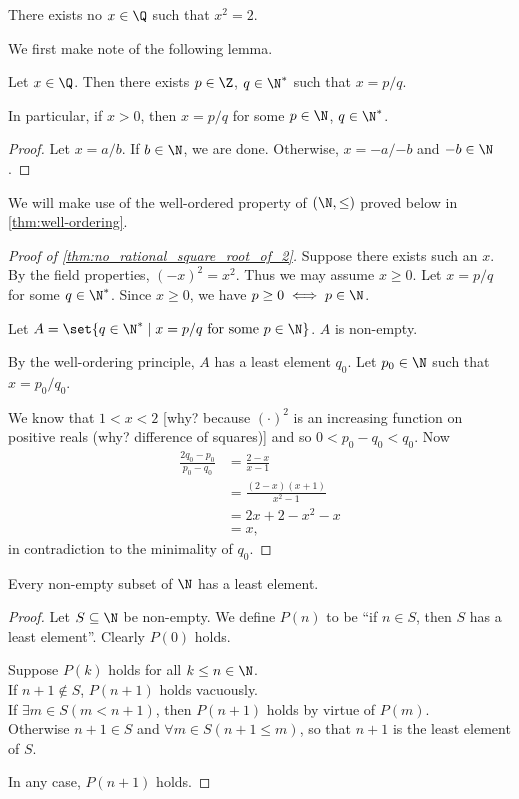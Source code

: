 \begin{theorem} \label{thm:no_rational_square_root_of_2}
    There exists no $x \in \Q$ such that $x^2 = 2$.
\end{theorem}
We first make note of the following lemma.
\begin{lemma} \label{thm:positive_denominator}
    Let $x \in \Q$.
    Then there exists $p \in \Z$, $q \in \N^*$ such that $x = p/q$.

    In particular, if $x > 0$, then $x = p/q$ for some $p \in \N$, $q \in \N^*$.
\end{lemma}
\begin{proof}
    Let $x = a/b$.
    If $b \in \N$, we are done.
    Otherwise, $x = -a/{-b}$ and $-b \in \N$. %
\end{proof}
We will make use of the well-ordered property of $(\N, \le)$ proved below in
\cref{thm:well-ordering}.
\begin{proof}[Proof of \cref{thm:no_rational_square_root_of_2}]
    Suppose there exists such an $x$.
    By the field properties, $(-x)^2 = x^2$.
    Thus we may assume $x \ge 0$.
    Let $x = p/q$ for some $q \in \N^*$.
    Since $x \ge 0$, we have $p \ge 0 \iff p \in \N$.

    Let $A = \set{q \in \N^* \mid x = p/q \text{ for some } p \in \N}$.
    $A$ is non-empty.

    By the well-ordering principle, $A$ has a least element $q_0$.
    Let $p_0 \in \N$ such that $x = p_0/q_0$.

    We know that $1 < x < 2$ [why? because $(\cdot)^2$ is an increasing function
    on positive reals (why? difference of squares)] and so $0 < p_0-q_0 < q_0$.
    Now \begin{align*}
        \frac{2q_0 - p_0}{p_0 - q_0}
            &= \frac{2 - x}{x - 1} \\
            &= \frac{(2 - x)(x + 1)}{x^2 - 1} \\
            &= 2x + 2 - x^2 - x \\
            &= x,
    \end{align*}
    in contradiction to the minimality of $q_0$.
\end{proof}

\begin{theorem} \label{thm:well-ordering}
    Every non-empty subset of $\N$ has a least element.
\end{theorem}
\begin{proof}
    Let $S \subseteq \N$ be non-empty.
    We define $P(n)$ to be ``if $n \in S$, then $S$ has a least element''.
    Clearly $P(0)$ holds.

    Suppose $P(k)$ holds for all $k \le n \in \N$. \\
    If $n+1 \notin S$, $P(n+1)$ holds vacuously. \\
    If $\exists m \in S (m < n+1)$, then $P(n+1)$ holds by virtue of $P(m)$. \\
    Otherwise $n+1 \in S$ and $\forall m \in S (n+1 \le m)$, so that $n+1$ is
    the least element of $S$.

    In any case, $P(n+1)$ holds.
\end{proof}

